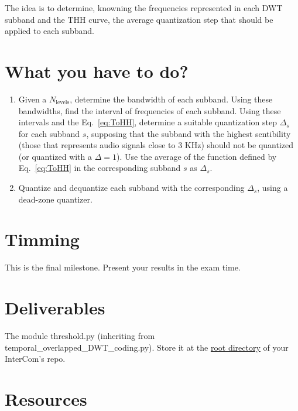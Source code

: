 The idea is to determine, knowning the frequencies represented in each
DWT subband and the THH curve, the average quantization step that
should be applied to each subband.

\section{What you have to do?}

  
\begin{enumerate}
\item Given a $N_{\text{levels}}$, determine the bandwidth of each
  subband. Using these bandwidths, find the interval of frequencies of
  each subband. Using these intervals and the Eq.~\ref{eq:ToHH},
  determine a suitable quantization step $\Delta_s$ for each subband
  $s$, supposing that the subband with the highest sentibility (those
  that represents audio signals close to $3$ KHz) should not be
  quantized (or quantized with a $\Delta=1$). Use the average of the
  function defined by Eq.~\ref{eq:ToHH} in the corresponding subband
  $s$ as $\Delta_s$.
\item Quantize and dequantize each subband with the corresponding
  $\Delta_s$, using a dead-zone quantizer.
\end{enumerate}

\section{Timming}

This is the final milestone. Present your results in the exam time.

\section{Deliverables}

The module threshold.py (inheriting from temporal\_overlapped\_DWT\_coding.py). Store it at the
\href{https://github.com/Tecnologias-multimedia/intercom}{root
  directory} of your InterCom's repo.

\section{Resources}



